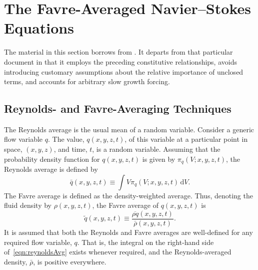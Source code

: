 \section{The Favre-Averaged Navier--Stokes Equations}

The material in this section borrows from
\citet{OliverFANSModels2011}.  It departs from that particular document in that
it employs the preceding constitutive relationships, avoids introducing
customary assumptions about the relative importance of unclosed terms, and
accounts for arbitrary slow growth forcing.

\subsection{Reynolds- and Favre-Averaging Techniques}
\label{sec:averagingtechniques}

The Reynolds average is the usual mean of a random variable.  Consider a
generic flow variable $q$.  The value, $q(x, y, z, t)$, of this variable at a
particular point in space, $(x, y, z)$, and time, $t$, is a random variable.
Assuming that the probability density function for $q(x, y, z, t)$ is given by
$\pi_q(V; x, y, z, t)$, the Reynolds average is defined by
%
\begin{equation}
\label{eqn:reynoldsAvg}
\bar{q}(x, y, z, t) \equiv \int V \pi_q(V; x, y, z, t) \,\mathrm{d} V.
\end{equation}
%
The Favre average is defined as the density-weighted average.  Thus,
denoting the fluid density by $\rho(x,y,z, t)$, the Favre average of
$q(x,y,z, t)$ is
%
\begin{equation}
\tilde{q}(x,y,z, t) \equiv \frac{ \overline{\rho q}(x,y,z, t) }{ \bar{\rho}(x,y,z, t) }.
\end{equation}
%
It is
assumed that both the Reynolds and Favre averages are well-defined for
any required flow variable, $q$.  That is, the integral on the
right-hand side of~\eqref{eqn:reynoldsAvg} exists whenever required,
and the Reynolds-averaged density, $\bar{\rho}$, is positive
everywhere.

